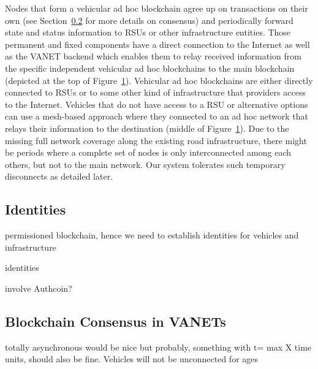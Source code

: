 \documentclass{llncs}
\begin{document}
{\begin{figure}[H]
				\label{fig:architecture-overview}
			\end{figure}
			Nodes that form a vehicular ad hoc blockchain agree up on transactions on their own (see Section~\ref{ss:consensus} for more details on consensus) and periodically forward state and status information to RSUs or other infrastructure entities. Those permanent and fixed components have a direct connection to the Internet as well as the VANET backend which enables them to relay received information from the specific independent vehicular ad hoc blockchains to the main blockchain (depicted at the top of Figure~\ref{fig:architecture-overview}). Vehicular ad hoc blockchains are either directly connected to RSUs or to some other kind of infrastructure that providers access to the Internet. Vehicles that do not have access to a RSU or alternative options can use a mesh-based approach where they connected to an ad hoc network that relays their information to the destination (middle of Figure~\ref{fig:architecture-overview}). Due to the missing full network coverage along the existing road infrastructure, there might be periods where a complete set of nodes is only interconnected among each others, but not to the main network. Our system tolerates such temporary disconnects as detailed later.
		

		\subsection{Identities}
			\label{ss:identities}
		
			permissioned blockchain, hence we need to establish identities for vehicles and infrastructure
			
			identities 
			
		
			involve Authcoin? \cite{leiding2017securing}\cite{AuthcoinLeiding2016MCIS}\cite{leiding2017mapping}
		

		\subsection{Blockchain Consensus in VANETs}
			\label{ss:consensus}
		
			totally asynchronous would be nice
			but probably, something with t= max X time units, should also be fine. Vehicles will not be unconnected for ages
			
}
\end{document}
